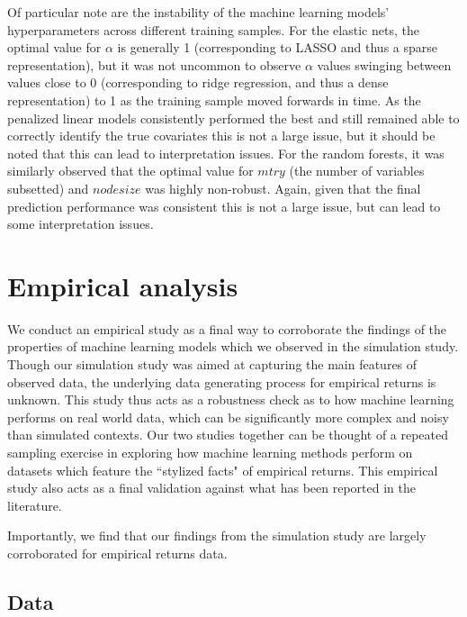 \documentclass{article}
\begin{document}
Of particular note are the instability of the machine learning models' hyperparameters across different training samples. For the elastic nets, the optimal value for $\alpha$ is generally 1 (corresponding to LASSO and thus a sparse representation), but it was not uncommon to observe $\alpha$ values swinging between values close to 0 (corresponding to ridge regression, and thus a dense representation) to 1 as the training sample moved forwards in time. As the penalized linear models consistently performed the best and still remained able to correctly identify the true covariates this is not a large issue, but it should be noted that this can lead to interpretation issues. For the random forests, it was similarly observed that the optimal value for $mtry$ (the number of variables subsetted) and $nodesize$ was highly non-robust. Again, given that the final prediction performance was consistent this is not a large issue, but can lead to some interpretation issues.


\section{Empirical analysis}

We conduct an empirical study as a final way to corroborate the findings of the properties of machine learning models which we observed in the simulation study. Though our simulation study was aimed at capturing the main features of observed data, the underlying data generating process for empirical returns is unknown. This study thus acts as a robustness check as to how machine learning performs on real world data, which can be significantly more complex and noisy than simulated contexts. Our two studies together can be thought of a repeated sampling exercise in exploring how machine learning methods perform on datasets which feature the ``stylized facts" of empirical returns. This empirical study also acts as a final validation against what has been reported in the literature.

Importantly, we find that our findings from the simulation study are largely corroborated for empirical returns data.

\subsection{Data}
\end{document}
